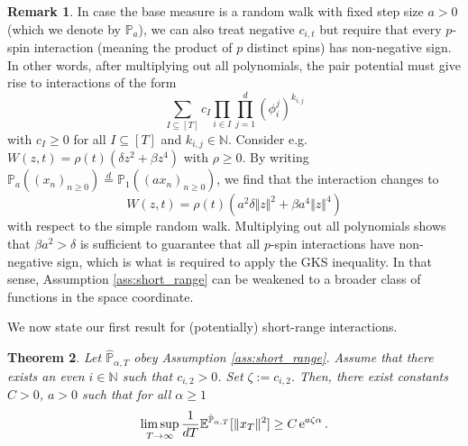 \documentclass[reqno,11pt]{amsart}
\newcommand{\1}{\mathds{1}}
\theoremstyle{plain}
\newtheorem{theorem}{Theorem}[section]
\theoremstyle{definition}
\newtheorem{remark}[theorem]{Remark}
\numberwithin{equation}{section}
\newcommand{\e}[1]{\,{\rm e}^{#1}\,}
\newcommand{\bbE}{{\mathbb E}}
\newcommand{\bbN}{{\mathbb N}}
\newcommand{\bbP}{{\mathbb P}}
\newcommand{\bbPh}{\hat{\bbP}}
\def\lt{\left}
\def\rt{\right}
\begin{document}
\begin{remark}
     In case the base measure is a random walk with fixed step size $a > 0$ (which we denote by $\bbP_a$), we can also treat negative $c_{i,t}$ but require that every $p$-spin interaction (meaning the product of $p$ distinct spins) has non-negative sign. In other words, after multiplying out all polynomials, the pair potential must give rise to interactions of the form
     $$\sum\limits_{I \subseteq [T]} c_I \prod\limits_{i \in I} \prod\limits_{j=1} ^d (\phi_i ^j)  ^{ k_{i,j}}$$
     with $c_I \ge 0$ for all $I \subseteq [T]$ and $k_{i,j} \in \bbN$.
     Consider e.g. $W(z,t) = \rho(t) ( \delta z^2 + \beta z^4)$ with $\rho \ge 0$. By writing $\bbP_a \lt((x_n)_{n \ge 0} \rt) \stackrel{d}{=} \bbP_1 \lt( (ax_n)_{n \ge 0} \rt)$, we find that the interaction changes to  
    $$W(z,t) = \rho(t) \lt( a^2 \delta \Vert z \Vert^2 + \beta a^4 \Vert z\Vert^4 \rt)$$
    with respect to the simple random walk.
    Multiplying out all polynomials shows that $\beta a^2 > \delta$ is sufficient to guarantee that all $p$-spin interactions have non-negative sign, which is what is required to apply the GKS inequality. In that sense, Assumption \ref{ass:short_range} can be weakened to a broader class of functions in the space coordinate.
\end{remark}
We now state our first result for (potentially) short-range interactions. 
\begin{theorem}
    \label{thm:short_range}
    Let $\bbPh_{\alpha,T}$ obey Assumption \ref{ass:short_range}. Assume that there exists an even $i\in\bbN$ such that $c_{i,2}>0$. Set $\zeta := c_{i,2}$. Then, there exist constants $C>0$, $a >0$ such that for all $\alpha \ge 1$
    $$\limsup\limits_{T \to \infty} \frac {1} {dT} \bbE^{\bbPh_{\alpha,T}} [ \Vert x_T \Vert^2] \ge C \e{a\zeta\alpha}.$$
\end{theorem} 
\end{document}
